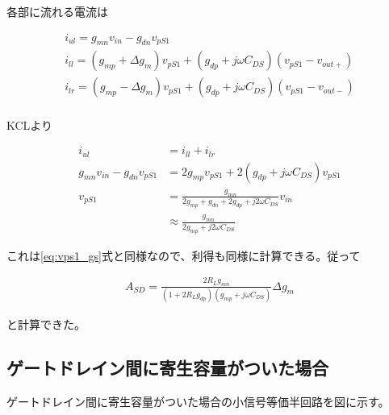 \documentclass[twocolumn]{jsarticle}
\begin{document}
            各部に流れる電流は

            \begin{align*}
                i_{ul}=g_{mn}v_{in}-g_{dn}v_{pS1}      \\
                i_{ll}=(g_{mp}+\Delta g_{m})v_{pS1}+(g_{dp}+j\omega C_{DS})(v_{pS1}-v_{out+})    \\
                i_{lr}=(g_{mp}-\Delta g_{m})v_{pS1}+(g_{dp}+j\omega C_{DS})(v_{pS1}-v_{out-})    \\    
            \end{align*}

            KCLより

            \begin{align*}
                i_{ul} &= i_{ll}+i_{lr}     \\
                g_{mn}v_{in}-g_{dn}v_{pS1} &= 2g_{mp}v_{pS1}+2(g_{dp}+j\omega C_{DS})v_{pS1}  \\
                v_{pS1} &= \frac{g_{mn}}{2g_{mp}+g_{dn}+2g_{dp}+j2\omega C_{DS}}v_{in}  \\
                &\approx\frac{g_{mn}}{2g_{mp}+j2\omega C_{DS}}
            \end{align*}

            これは\eqref{eq:vps1_gs}式と同様なので、利得も同様に計算できる。従って

            \begin{align*}
                A_{SD} = \frac{2R_{L}g_{mn}}{( 1+2R_{L}g_{dp} )( g_{mp}+j\omega C_{DS} )}\Delta g_{m}   \tag{8} 
            \end{align*}

            と計算できた。

            \newpage

            \subsection{ゲートドレイン間に寄生容量がついた場合}
                ゲートドレイン間に寄生容量がついた場合の小信号等価半回路を図に示す。
            
\end{document}

